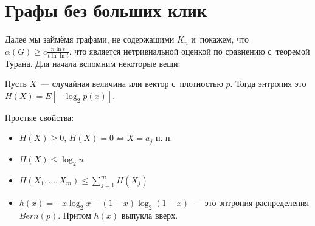 \documentclass{article}
\begin{document}
\section{Графы без больших клик}


Далее мы займёмя графами, не содержащими $K_n$ и~покажем, что $\alpha(G) \ge
c \frac{n \ln t}{t \ln \ln t}$, что является нетривиальной оценкой по сравнению
с~теоремой Турана. Для начала вспомним некоторые вещи:

\begin{definition}
	Пусть $X$~--- случайная величина или вектор с~плотностью $p$. Тогда
	энтропия это $H(X) = E\left[ -\log_2 p(x) \right]$.
\end{definition}

Простые свойства:
\begin{itemize}
	\item $H(X) \ge 0$, $H(X) = 0 \Leftrightarrow X = a_j$ п. н.
	\item $H(X) \le \log_2 n$
	\item $H(X_1, \ldots, X_m) \le \sum\limits_{j=1}^m H(X_j)$
	\item $h(x) = -x \log_2 x - (1 - x) \log_2 (1 - x)$~--- это энтропия
		распределения $Bern(p)$. Притом $h(x)$ выпукла вверх.
\end{itemize}
\end{document}
